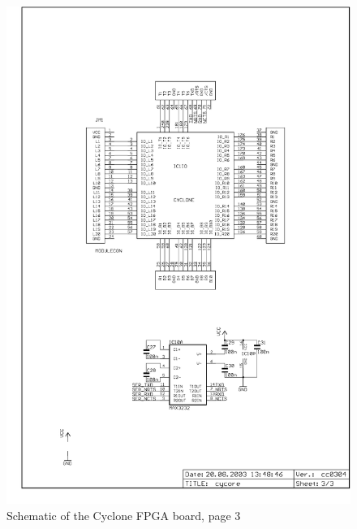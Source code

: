 \begin{figure}
    \centering
    \includegraphics[scale=0.87]{appendix/cycore_p3}
    \caption{Schematic of the Cyclone FPGA board, page 3}
\end{figure}
